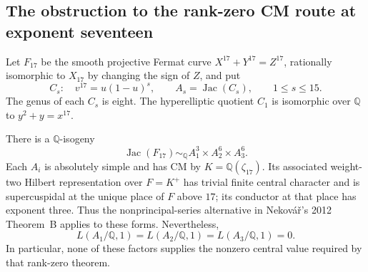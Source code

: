 \subsection{The obstruction to the rank-zero CM route at exponent seventeen}

Let $F_{17}$ be the smooth projective Fermat curve
$X^{17}+Y^{17}=Z^{17}$, rationally isomorphic to $X_{17}$ by
changing the sign of $Z$, and put
\[
 C_s:\quad v^{17}=u(1-u)^s,\qquad
 A_s=\operatorname{Jac}(C_s),\qquad 1\leq s\leq15.
\]
The genus of each $C_s$ is eight.  The hyperelliptic quotient $C_1$
is isomorphic over $\mathbb Q$ to $y^2+y=x^{17}$.

\begin{proposition}
\label{prop:lm-seventeen-obstruction}
There is a $\mathbb Q$-isogeny
\[
 \operatorname{Jac}(F_{17})\sim_{\mathbb Q}
 A_1^3\times A_2^6\times A_3^6.
\]
Each $A_i$ is absolutely simple and has CM by
$K=\mathbb Q(\zeta_{17})$.  Its associated weight-two Hilbert
representation over $F=K^+$ has trivial finite central character and
is supercuspidal at the unique place of $F$ above $17$; its conductor
at that place has exponent three.  Thus the nonprincipal-series
alternative in Nekov\'a\v r's 2012 Theorem~B applies to these forms.
Nevertheless,
\[
 L(A_1/\mathbb Q,1)=L(A_2/\mathbb Q,1)
                  =L(A_3/\mathbb Q,1)=0.
\]
In particular, none of these factors supplies the nonzero central
value required by that rank-zero theorem.
\end{proposition}

